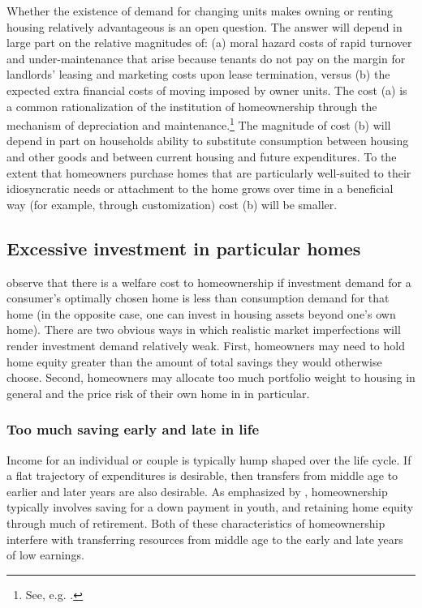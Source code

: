 \documentclass[12pt]{article}
\begin{document}
Whether the existence of demand for changing units makes owning or renting
housing relatively advantageous is an open question.  The answer will depend in
large part on the relative magnitudes of: (a) moral hazard costs of rapid
turnover and under-maintenance that arise because tenants do not pay on the
margin for landlords' leasing and marketing costs upon lease termination, versus
(b) the expected extra financial costs of moving imposed by owner units.  The
cost (a) is a common rationalization of the institution of homeownership through
the mechanism of depreciation and maintenance.\footnote{See, e.g.
\citet{Shelton}.}  The magnitude of cost (b) will depend in part on households
ability to substitute consumption between housing and other goods and between
current housing and future expenditures.  To the extent that homeowners purchase
homes that are particularly well-suited to their idiosyncratic needs or
attachment to the home grows over time in a beneficial way (for example, through
customization) cost (b) will be smaller.

\subsection{Excessive investment in particular homes}

\citet{HendersonIoannides} observe that there is a welfare cost to homeownership
if investment demand for a consumer's optimally chosen home is less than
consumption demand for that home (in the opposite case, one can invest in
housing assets beyond one's own home).  There are two obvious ways in which
realistic market imperfections will render investment demand relatively weak.
First, homeowners may need to hold home equity greater than the amount of total
savings they would otherwise choose.  Second, homeowners may allocate too much
portfolio weight to housing in general and the price risk of their own home in
in particular.

\subsubsection{Too much saving early and late in life}

Income for an individual or couple is typically hump shaped over the life cycle.
If a flat trajectory of expenditures is desirable, then transfers from middle
age to earlier and later years are also desirable.  As emphasized by
\citet{ArtleVaraiya}, homeownership typically involves saving for a down payment
in youth, and retaining home equity through much of retirement.  Both of these
characteristics of homeownership interfere with transferring resources from
middle age to the early and late years of low earnings.
\end{document}
